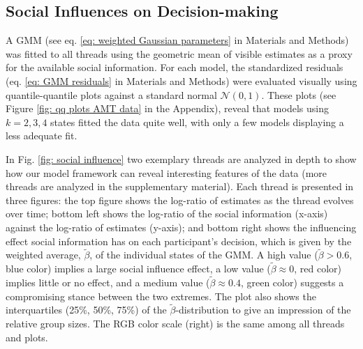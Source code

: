 \documentclass[9pt,twocolumn,twoside,lineno]{pnas-new}
\begin{document}
\subsection*{Social Influences on Decision-making} 
A GMM (see eq. \ref{eq: weighted Gaussian parameters} in Materials and Methods) was fitted to all threads using the geometric mean of visible estimates as a proxy for the available social information. For each model, the standardized residuals (eq. \ref{eq: GMM residuals} in Materials and Methods) were evaluated visually using quantile-quantile plots against a standard normal $\mathcal{N}(0,1)$. These plots (see Figure \ref{fig: qq plots AMT data} in the Appendix), reveal that models using $k=2,3,4$ states fitted the data quite well, with only a few models displaying a less adequate fit. 


In Fig. \ref{fig: social influence} two exemplary threads are analyzed in depth to show how our model framework can reveal interesting features of the data (more threads are analyzed in the supplementary material). Each thread is presented in three figures: the top figure shows the log-ratio of estimates as the thread evolves over time; bottom left shows the log-ratio of the social information (x-axis) against the log-ratio of estimates (y-axis); and bottom right shows the influencing effect social information has on each participant's decision, which is given by the weighted average, $\tilde{\beta}$, of the individual states of the GMM. A high value ($\tilde{\beta}>0.6$, blue color) implies a large social influence effect, a low value ($\tilde{\beta}\approx 0$, red color) implies little or no effect, and a medium value ($\tilde{\beta} \approx 0.4$, green color) suggests a compromising stance between the two extremes. The plot also shows the interquartiles (25\%, 50\%, 75\%) of the $\tilde{\beta}$-distribution to give an impression of the relative group sizes. The RGB color scale (right) is the same among all threads and plots. 
\end{document}
